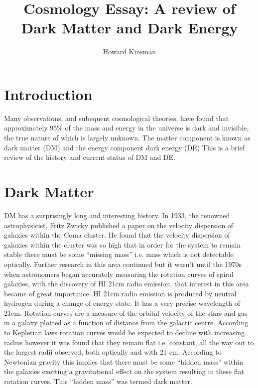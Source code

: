 \documentclass[a4paper,12pt]{article}
\author{Howard Kinsman}
\title{Cosmology Essay: A review of Dark Matter and Dark Energy}
\begin{document}
\maketitle
\section{Introduction}
Many observations, and subequent cosmological theories, have found that approximately 95\% of the mass and energy in the universe is dark and invisible, the true nature of which is
largely unknown. The matter component is known as dark matter (DM) and the energy component dark energy (DE) This is a brief review of the history and current status of 
DM and DE.
\section{Dark Matter}
DM has a surprisingly long and interesting history. In 1933, the renowned astrophysicist, Fritz Zwicky published a paper on the velocity dispersion of galaxies within the Coma cluster. He found
that the velocity dispersion of galaxies within the cluster was so high that in order for the system to remain stable there must be some ``missing mass'' i.e. mass which
is not detectable optically. Further research in this area continued but it wasn't until the 1970s when astronomers began accurately measuring the rotation curves of spiral galaxies,
with the discovery of HI 21cm radio emission, that interest in this area became of great importance. HI 21cm radio emission is produced by neutral hydrogen during a change of energy
state. It has a very precise wavelength of 21cm.
Rotation curves are a measure of the orbital velocity of the stars and gas in a galaxy plotted as a function of distance from the galactic centre. According to
Keplerian laws rotation curves would be expected to decline with increasing radius however it was found that they remain flat i.e. constant, all the way out to the largest radii observed, 
both optically and with 21 cm. According to Newtonian gravity this implies that there must be some ``hidden mass'' within the galaxies exerting a gravitational effect on the system resulting
in these flat rotation curves. This ``hidden mass'' was termed dark matter.
\end{document}
